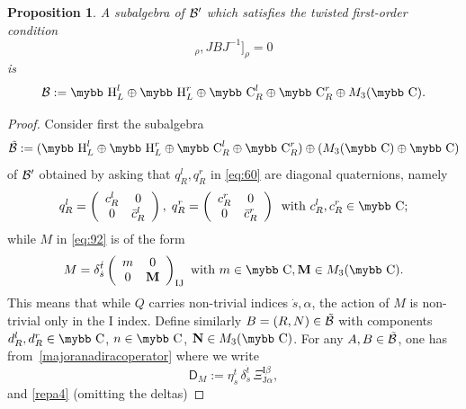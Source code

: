 \documentclass[11pt]{article}
\def\bb#1{\hbox{\mybb#1}}
\newcommand{\sI}{\mathrm  I}
\newcommand{\sJ}{\mathrm J}
\newcommand{\sD}{\mathsf D}
\newtheorem{prop}{Proposition}[section]
\begin{document}
\begin{prop}
\label{lemmasigma}
A subalgebra of ${\cal B}'$ which satisfies the twisted first-order
condition
\begin{equation}
[[D_M, A]_\rho, JBJ^{-1}]_\rho = 0 
\label{eq:93}
\end{equation}
is 
\begin{equation}
  \label{eq:96}
  {\cal B}:= \bb H^l_L \oplus \bb
  H^r_L\oplus \bb C^l_R \oplus \bb C_R^r \oplus  M_3(\bb C).
\end{equation}
\end{prop}
\begin{proof}
Consider first the subalgebra
\begin{equation}
\tilde{\cal B}:= (\bb H^l_L \oplus \bb H^r_L \oplus \bb C^l_R \oplus \bb C^r_R)\oplus
(M_3(\bb C) \oplus \bb C)
\label{eq:71}
\end{equation}
of $\cal B'$ obtained by asking that $q^l_R, q^r_R$ in
\eqref{eq:60} are diagonal quaternions, namely
\begin{equation}
  \label{eq:103}
  q^l_R=\left(\begin{array}{cc} c^l_R & 0 \\ 0 &\bar
      c^l_R\end{array}\right), \; q^r_R=\left(\begin{array}{cc} c^r_R & 0 \\ 0 &\bar
      c^r_R\end{array}\right)\,\text{ with }
  c^l_R, c^r_R\in\bb C;
\end{equation}
while $M$ in \eqref{eq:92} is of the form
\begin{equation}
  \label{eq:101}
M = \delta_{\dot s}^{\dot t} \left(\begin{array}{cc}
     m & 0 \\ 0 & \bf M \end{array}\right)_{\sI\sJ} \text{ with }
m\in \bb C, {\bf M}\in M_3(\bb C).
\end{equation}
This means that while $Q$ carries non-trivial indices $\dot s,
  \alpha$, the action of $M$ is non-trivial only in the $\sI$ index. 
Define similarly  $B=(R,N)\in\tilde{\cal B}$ with components
  $d^l_R, d^r_R\in\bb C$, $n\in \bb C$, ${\bf N}\in M_3(\bb C)$. 
For any $A, B\in\cal \tilde B$, one has
from~\eqref{majoranadiracoperator}  where we write
    \begin{equation}
\sD_M := \eta_s^t\,\delta_{\dot s}^{\dot t}\,
  \Xi_{\sJ\alpha}^{\sI\beta},
\label{eq:190}
  \end{equation}
and \eqref{repa4} (omitting the deltas)

\end{proof}
\end{document}
